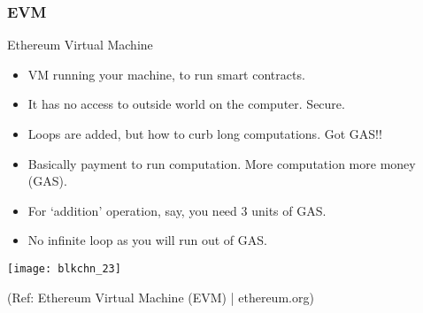 \begin{frame}[fragile]\frametitle{EVM}
Ethereum Virtual Machine

\begin{itemize}
\item VM running your machine, to run smart contracts.
\item It has no access to outside world on the computer. Secure.
\item Loops are added, but how to curb long computations. Got GAS!!
\item Basically payment to run computation. More computation more money (GAS). 
\item For `addition' operation, say, you need 3 units of GAS.
\item No infinite loop as you will run out of GAS.
\end{itemize}

\begin{center}
\texttt{[image: blkchn\_23]}

{\tiny (Ref: Ethereum Virtual Machine (EVM) | ethereum.org)}
\end{center}

\end{frame}



